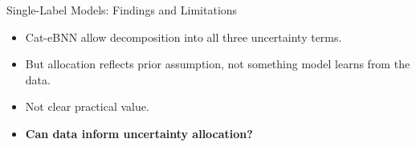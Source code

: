 \begin{frame}{Single-Label Models: Findings and Limitations}\label{frm:cat-ebnn-interpretation}
\begin{itemize}
\setlength{\itemsep}{5mm}
\item Cat-eBNN allow decomposition into all three uncertainty terms.
\item But allocation reflects prior assumption, not something model learns from the data.
\item Not clear practical value. %
\item \textbf{Can data inform uncertainty allocation?}
\end{itemize}
\end{frame}
